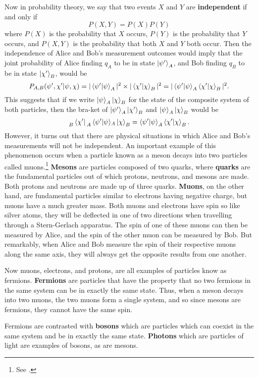 Now in probability theory, we say that two events $X$ and $Y$ are \textbf{independent} if and only if 
\begin{equation}\label{indep}
    P(X,Y)=P(X)P(Y)
\end{equation}
where $P(X)$ is the probability that $X$ occurs, $P(Y)$ is the probability that $Y$ occurs, and $P(X,Y)$ is the probability that both $X$ and $Y$ both occur. Then the independence of Alice and Bob's measurement outcomes would imply that the joint probability of Alice finding $q_A$ to be in state $
\ket{\psi'}_A$, and Bob finding $q_B$ to be in state $\ket{\chi'}_B$, would be 
$$P_{A,B}(\psi',\chi'|\psi,\chi)=|\ip{\psi'}{\psi}_A|^2\times|\ip{\chi'}{\chi}_B|^2=|\ip{\psi'}{\psi}_A\ip{\chi'}{\chi}_B|^2.$$
This suggests that if we write $\ket{\psi}_A\ket{\chi}_B$ for the state of the composite system of both particles, then the bra-ket of $\ket{\psi'}_A\ket{\chi'}_B$ and $\ket{\psi}_A\ket{\chi}_B$ 
would be
$$\prescript{}{B}{ \bra*{\chi'}}\prescript{}{A}{\ip*{\psi'}{\psi}}_A\ket*{\chi}_B=\ip{\psi'}{\psi}_A\ip{\chi'}{\chi}_B.
$$
However, it turns out that there are physical situations in which Alice and Bob's measurements will not be independent. An important example of this phenomenon occurs when a particle known as a meson decays into two particles called muons.\footnote{See \cite[p. 242]{Sakurai}.} \textbf{Mesons} are particles composed of two quarks, where \textbf{quarks} are the fundamental particles out of which protons, neutrons, and mesons are made. Both protons and neutrons are made up of three quarks. \textbf{Muons}, on the other hand, are fundamental particles similar to electrons having negative charge, but muons have a much greater mass. Both muons and electrons have spin so like silver atoms, they will be deflected in one of two directions when travelling through a Stern-Gerlach apparatus. The spin of one of these muons can then be measured by Alice, and the spin of the other muon can be measured by Bob. But remarkably, when Alice and Bob measure the spin of their respective muons along the same axis, they will always get the opposite results from one another. 

Now muons, electrons, and protons, are all examples of particles know as fermions. \textbf{Fermions} are particles that have the property that no two fermions in the same system can be in exactly the same state. Thus, when a meson decays into two muons, the two muons form a single system, and so since mesons are fermions, they cannot have the same spin.

Fermions are contrasted with \textbf{bosons} which are particles which can coexist in the same system and be in exactly the same state. \textbf{Photons} which are particles of light are examples of bosons, as are mesons.

